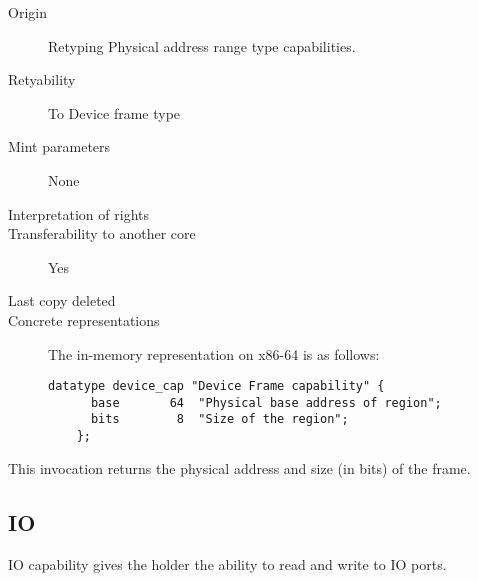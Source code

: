 \begin{description}
\item[Origin] Retyping Physical address range type capabilities.
  
\item[Retyability] To Device frame type
  
\item[Mint parameters] None
  
\item[Interpretation of rights] 
  
\item[Transferability to another core] Yes

\item[Last copy deleted] 
  
\item[Concrete representations] The in-memory representation on x86-64 is as follows:
  
  \begin{lstlisting}[language=Mackerel]
    datatype device_cap "Device Frame capability" {
      base       64  "Physical base address of region";
      bits        8  "Size of the region";
    };
  \end{lstlisting}
\end{description}  

 This invocation returns the physical
address and size (in bits) of the frame.

\subsection{IO}
IO capability gives the holder the ability to read and write to IO
ports.


